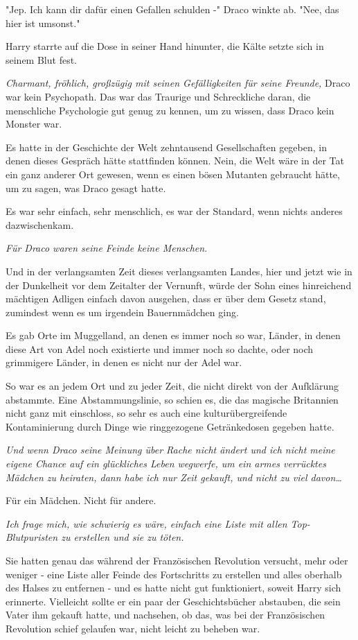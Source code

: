 {"Jep. Ich kann dir dafür einen Gefallen schulden -" Draco winkte ab. "Nee, das hier ist umsonst."

Harry starrte auf die Dose in seiner Hand hinunter, die Kälte setzte sich in seinem Blut fest.

\emph{Charmant, fröhlich, großzügig mit seinen Gefälligkeiten für seine Freunde,} Draco war kein Psychopath. Das war das Traurige und Schreckliche daran, die menschliche Psychologie gut genug zu kennen, um zu wissen, dass Draco kein Monster war.

Es hatte in der Geschichte der Welt zehntausend Gesellschaften gegeben, in denen dieses Gespräch hätte stattfinden können. Nein, die Welt wäre in der Tat ein ganz anderer Ort gewesen, wenn es einen bösen Mutanten gebraucht hätte, um zu sagen, was Draco gesagt hatte.

Es war sehr einfach, sehr menschlich, es war der Standard, wenn nichts anderes dazwischenkam.

\emph{Für Draco waren seine Feinde keine Menschen}.

Und in der verlangsamten Zeit dieses verlangsamten Landes, hier und jetzt wie in der Dunkelheit vor dem Zeitalter der Vernunft, würde der Sohn eines hinreichend mächtigen Adligen einfach davon ausgehen, dass er über dem Gesetz stand, zumindest wenn es um irgendein Bauernmädchen ging.

Es gab Orte im Muggelland, an denen es immer noch so war, Länder, in denen diese Art von Adel noch existierte und immer noch so dachte, oder noch grimmigere Länder, in denen es nicht nur der Adel war.

So war es an jedem Ort und zu jeder Zeit, die nicht direkt von der Aufklärung abstammte. Eine Abstammungslinie, so schien es, die das magische Britannien nicht ganz mit einschloss, so sehr es auch eine kulturübergreifende Kontaminierung durch Dinge wie ringgezogene Getränkedosen gegeben hatte.

\emph{Und wenn Draco seine Meinung über Rache nicht ändert und ich nicht meine eigene Chance auf ein glückliches Leben wegwerfe, um ein armes verrücktes Mädchen zu heiraten, dann habe ich nur Zeit gekauft, und nicht zu viel davon…}

Für ein Mädchen. Nicht für andere.

\emph{Ich frage mich, wie schwierig es wäre, einfach eine Liste mit allen Top-Blutpuristen zu erstellen und sie zu töten.}

Sie hatten genau das während der Französischen Revolution versucht, mehr oder weniger - eine Liste aller Feinde des Fortschritts zu erstellen und alles oberhalb des Halses zu entfernen - und es hatte nicht gut funktioniert, soweit Harry sich erinnerte. Vielleicht sollte er ein paar der Geschichtsbücher abstauben, die sein Vater ihm gekauft hatte, und nachsehen, ob das, was bei der Französischen Revolution schief gelaufen war, nicht leicht zu beheben war.

}
